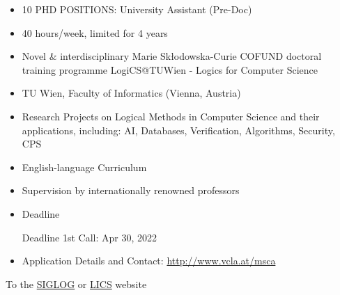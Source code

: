 \documentclass[prodmode,acmtecs]{acmsmall} %
\begin{document}
\begin{itemize}\item  10 PHD POSITIONS: University Assistant (Pre-Doc)  
 
\item  40 hours/week, limited for 4 years 
 
\item  Novel \& interdisciplinary Marie Skłodowska-Curie COFUND doctoral training programme LogiCS@TUWien - Logics for Computer Science 
 
\item  TU Wien, Faculty of Informatics (Vienna, Austria) 
 
\item  Research Projects on Logical Methods in Computer Science and their applications, including: AI, Databases, Verification, Algorithms, Security, CPS 
 
\item  English-language Curriculum 
 
\item  Supervision by internationally renowned professors 
 
\item  Deadline 
 
Deadline 1st Call: Apr 30, 2022 
 
\item  Application Details and Contact: \href{http://www.vcla.at/msca}{http://www.vcla.at/msca} 
 
\end{itemize}


To the \href{http://siglog.org/}{SIGLOG} or \href{https://lics.siglog.org}{LICS} website
\end{document}
